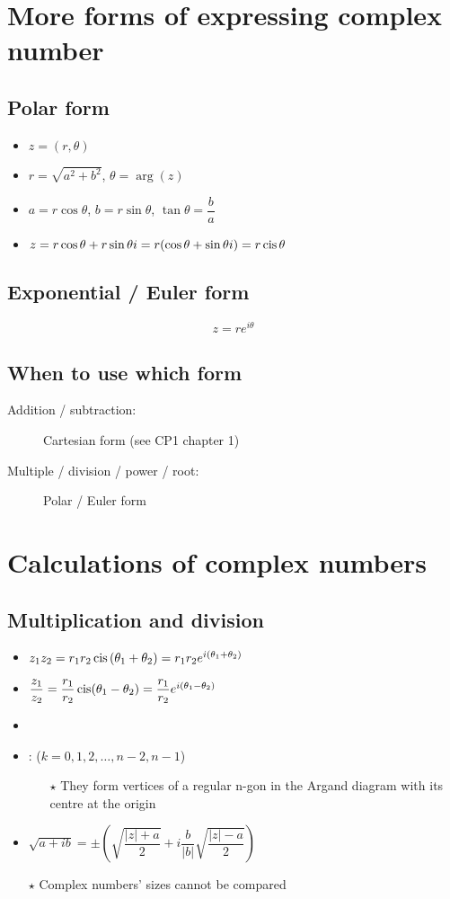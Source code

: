 \section{More forms of expressing complex number}
\subsection{Polar form}
\begin{itemize}
    \item $z=(r,\theta)$
    \item $r=\sqrt{a^2+b^2}$, $\theta = \arg(z)$
    \item $a=r\cos\theta$, $b=r\sin\theta$, $\tan\theta=\dfrac{b}{a}$
    \item $z=r\cos\theta+r\sin\theta i = r(\cos\theta+\sin\theta i)=r\operatorname{cis} \theta$
\end{itemize}
\subsection{Exponential / Euler form}
$$z=re^{i\theta}$$
\subsection{When to use which form}
\begin{description}
	\item[Addition / subtraction: ] Cartesian form (see CP1 chapter 1)
	\item[Multiple / division / power / root: ] Polar / Euler form
\end{description}

\section{Calculations of complex numbers}
\subsection{Multiplication and division}
\begin{itemize}
	\item $z_1z_2=r_1r_2\operatorname{cis}\left(\theta_1+\theta_2\right)=r_1r_2e^{i(\theta_1+\theta_2)}$
	\item $\dfrac{z_1}{z_2}=\dfrac{r_1}{r_2}\operatorname{cis}(\theta_1-\theta_2)=\dfrac{r_1}{r_2}e^{i(\theta_1-\theta_2)}$
	\item 
	\item :  ($k=0,1,2,\dots,n-2,n-1$)
	\begin{itemize}
		\item[$\star$] They form vertices of a regular n-gon in the Argand diagram with its centre at the origin
	\end{itemize}
	\item $\sqrt{a+ib}=\pm\left(\sqrt{\dfrac{|z|+a}{2}}+i\dfrac{b}{|b|}\sqrt{\dfrac{|z|-a}{2}}\right)$

	\item[$\star$] Complex numbers' sizes cannot be compared
\end{itemize}

